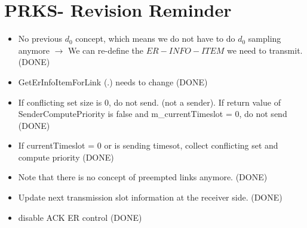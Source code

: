 \section {PRKS- Revision Reminder}
\begin{itemize}
  \item No previous $d_0$ concept, which means we do not have to do $d_0$ sampling anymore $\rightarrow$ We can re-define the $ER-INFO-ITEM$ we need to transmit.(DONE)
  \item GetErInfoItemForLink (.) needs to change (DONE)
  \item If conflicting set size is 0, do not send. (not a sender). If return value of SenderComputePriority is false and m\_currentTimeslot = 0, do not send (DONE)
  \item If currentTimeslot = 0 or is sending timesot, collect conflicting set and compute priority (DONE)
  \item Note that there is no concept of preempted links anymore. (DONE)
  \item Update next transmission slot information at the receiver side. (DONE)
  \item disable ACK ER control (DONE)
\end{itemize}
